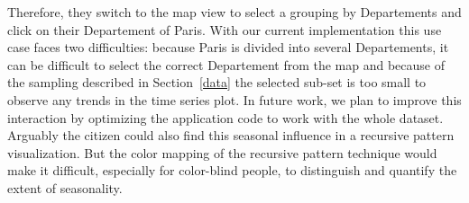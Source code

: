 Therefore, they switch to the map view to select a grouping by Departements and click on their Departement of Paris.
With our current implementation this use case faces two difficulties: \Ni because Paris is divided into several Departements, it can be difficult to select the correct Departement from the map and \Nii because of the sampling described in Section~\ref{data} the selected sub-set is too small to observe any trends in the time series plot.
In future work, we plan to improve this interaction by optimizing the application code to work with the whole dataset.
Arguably the citizen could also find this seasonal influence in a recursive pattern visualization. But the color mapping of the recursive pattern technique would make it difficult, especially for color-blind people, to distinguish and quantify the extent of seasonality.

